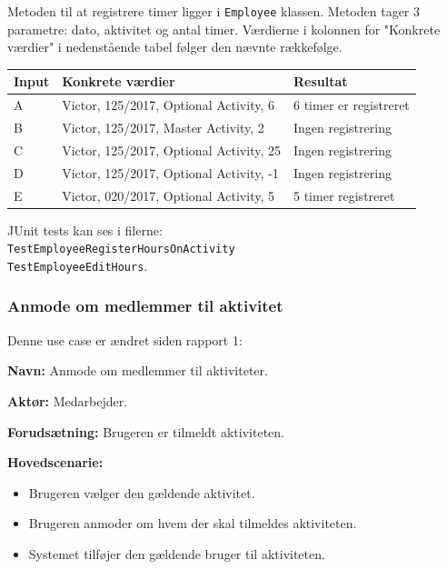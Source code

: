 Metoden til at registrere timer ligger i \texttt{Employee} klassen. Metoden tager 3 parametre: dato, aktivitet og antal timer. Værdierne i kolonnen for "Konkrete værdier" i nedenstående tabel følger den nævnte rækkefølge.

\begin{table}[H]
    \centering
    \begin{tabular}{|l|l|l|}
    \hline
    \textbf{Input} &     \textbf{Konkrete værdier}              & \textbf{Resultat}                       \\ \hline
    A     & Victor, 125/2017, Optional Activity, 6  & 6 timer er registreret    \\ \hline
    B     & Victor, 125/2017, Master Activity, 2    & Ingen registrering        \\ \hline
    C     & Victor, 125/2017, Optional Activity, 25 & Ingen registrering        \\ \hline
    D     & Victor, 125/2017, Optional Activity, -1 & Ingen registrering        \\ \hline
    E     & Victor, 020/2017, Optional Activity, 5  & 5 timer registreret       \\ \hline
    \end{tabular}
    
\end{table}

JUnit tests kan ses i filerne: \\
\texttt{TestEmployeeRegisterHoursOnActivity} \\ 
\texttt{TestEmployeeEditHours}. \\

\subsubsection{Anmode om medlemmer til aktivitet}

Denne use case er ændret siden rapport 1:

\textbf{Navn:} Anmode om medlemmer til aktiviteter.

\textbf{Aktør:} Medarbejder.

\textbf{Forudsætning:} Brugeren er tilmeldt aktiviteten.
    
\textbf{Hovedscenarie: }
    
\begin{itemize}
    \item Brugeren vælger den gældende aktivitet.
    \item Brugeren anmoder om hvem der skal tilmeldes aktiviteten.
    \item Systemet tilføjer den gældende bruger til aktiviteten.
\end{itemize}

